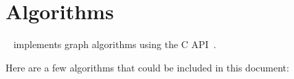 \section{Algorithms}

\lagraph~\cite{DBLP:conf/ipps/MattsonDKBMMY19} implements graph algorithms using the \grb C API~\cite{DBLP:conf/hpec/MattsonYMBM17}.

Here are a few algorithms that could be included in this document:




























